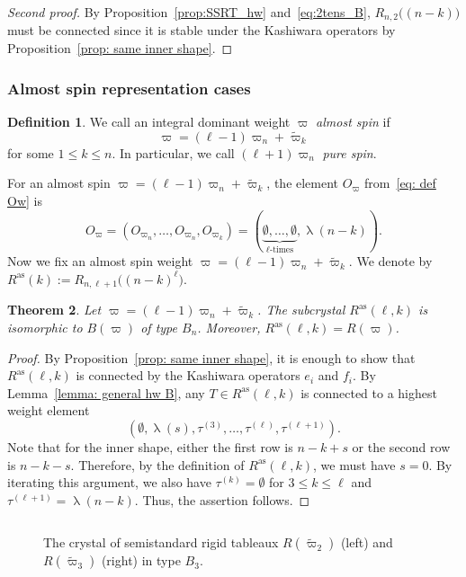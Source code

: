 \documentclass[11pt, leqno]{amsart}
\theoremstyle{plain}
\newtheorem{theorem}{Theorem}[section]
\theoremstyle{definition}
\newtheorem{definition}[theorem]{Definition}
\numberwithin{equation}{section}
\newcommand{\fw}{\varpi} %
\newcommand{\tfw}{\widetilde{\fw}} %
\newcommand{\seteq}{\mathbin{:=}}
\newcommand{\defn}[1]{{\color{darkred}\emph{#1}}} %
\begin{document}
\begin{proof}[Second proof]
By Proposition~\ref{prop:SSRT_hw} and~\eqref{eq:2tens_B}, $R_{n,2}\bigl( (n-k) \bigr)$ must be connected since it is stable under the Kashiwara operators by Proposition~\ref{prop: same inner shape}.
\end{proof}

\subsubsection{Almost spin representation cases}

\begin{definition}
We call an integral dominant weight $\fw$ \defn{almost spin} if
\[
\fw = (\ell-1) \fw_n +\tfw_k
\]
for some $1 \le k \le n$. In particular, we call $(\ell+1)\fw_n$ \defn{pure spin}.
\end{definition}

For an almost spin $\fw = (\ell-1) \fw_n +\tfw_k$, the element $O_\fw$ from~\eqref{eq: def Ow} is
\[
O_\fw= \left( O_{\fw_{n}},\ldots,O_{\fw_{n}},O_{\fw_{k}} \right) = (\underbrace{\emptyset,\ldots,\emptyset}_{\text{$\ell$-times}},\uplambda(n-k)).
\]
Now we fix an almost spin weight $\fw = (\ell-1) \fw_n +\tfw_k$. We denote by $R^\mathrm{as}(k) \seteq R_{n,\ell+1}\bigl((n-k)^{\ell}\bigr)$.

\begin{theorem}
\label{thm: main as}
Let $\fw = (\ell-1) \fw_n +\tfw_k$.
The subcrystal $R^\mathrm{as}(\ell, k)$ is isomorphic to $B(\fw)$ of type $B_n$. Moreover, $R^\mathrm{as}(\ell, k) = R(\fw)$.
\end{theorem}

\begin{proof}
By Proposition~\ref{prop: same inner shape}, it is enough to show that $R^\mathrm{as}(\ell,k)$ is connected by the Kashiwara operators $e_i$ and $f_i$.
By Lemma~\ref{lemma: general hw B}, any $T \in R^\mathrm{as}(\ell,k)$ is connected to a highest weight element
\[
(\emptyset,\uplambda(s),\tau^{(3)},\ldots,\tau^{(\ell)},\tau^{(\ell+1)}).
\]
Note that for the inner shape, either the first row is $n-k+s$ or the second row is $n-k-s$. Therefore, by the definition of $R^\mathrm{as}(\ell,k)$, we must have $s=0$. By iterating this argument, we also have $\tau^{(k)} = \emptyset$ for $3 \le k \le \ell$ and $\tau^{(\ell+1)} = \uplambda(n-k)$. Thus, the assertion follows.
\end{proof}

\begin{figure}[p]
\[

\]
\caption{The crystal of semistandard rigid tableaux $R(\tfw_2)$ (left) and $R(\tfw_3)$ (right) in type $B_3$.}
\label{fig:rigid_tableaux2}
\end{figure}
\end{document}
